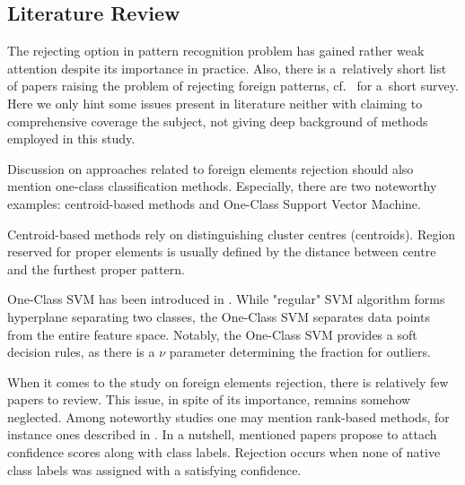 \documentclass{llncs}
\begin{document}
\vspace{-6pt}
\subsection{Literature Review}
  \label{sec:Literature Review}
\vspace{-3pt}

The rejecting option in pattern recognition problem has gained rather weak attention despite its importance in practice. Also, there is a~relatively short list of papers raising the problem of rejecting foreign patterns, cf.~\cite{HomendaICAART2015} for a~short survey.%
Here we only hint some issues present in literature neither with claiming to comprehensive coverage the subject, not giving deep background of methods employed in this study.

Discussion on approaches related to foreign elements rejection should also mention one-class classification methods. Especially, there are two noteworthy examples: centroid-based methods and One-Class Support Vector Machine.

Centroid-based methods rely on distinguishing cluster centres (centroids). Region reserved for proper elements is usually defined by the distance between centre and the furthest proper pattern.

One-Class SVM has been introduced in \cite{ScholkopfWilliamsonSmola1992}. While "regular" SVM algorithm forms hyperplane separating two classes, the One-Class SVM separates data points from the entire feature space. Notably, the One-Class SVM provides a soft decision rules, as there is a $\nu$ parameter determining the fraction for outliers.  


When it comes to the study on foreign elements rejection, there is relatively few papers to review. This issue, in spite of its importance, remains somehow neglected. Among noteworthy studies one may mention rank-based methods, for instance ones described in \cite{BertolamiZimmermannBunke2006,BurgerKessentiniPaquet2011,EladHel-OrKeshet2001,HempstalkFrankWitten2008,SchemeHudginsEnglehart2013,TaxDuin2008,WangCasasent2009}.
In a nutshell, mentioned papers propose to attach confidence scores along with class labels. Rejection occurs when none of native class labels was assigned with a satisfying confidence.
\end{document}
